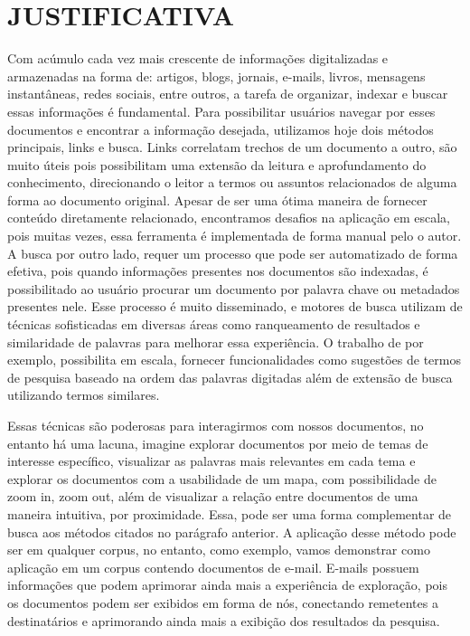 \documentclass[12pt,a4paper]{article}
\begin{document}
\section{JUSTIFICATIVA}
Com acúmulo cada vez mais crescente de informações digitalizadas e armazenadas na forma de: artigos, blogs, jornais, e-mails, livros, mensagens instantâneas, redes sociais, entre outros, a tarefa de organizar, indexar e buscar essas informações é fundamental. Para possibilitar usuários navegar por esses documentos e encontrar a informação desejada, utilizamos hoje dois métodos principais, links e busca. Links correlatam trechos de um documento a outro, são muito úteis pois possibilitam uma extensão da leitura e aprofundamento do conhecimento, direcionando o leitor a termos ou assuntos relacionados de alguma forma ao documento original. Apesar de ser uma ótima maneira de fornecer conteúdo diretamente relacionado, encontramos desafios na aplicação em escala, pois muitas vezes, essa ferramenta  é implementada de forma manual pelo o autor. A busca por outro lado, requer um processo que pode ser automatizado de forma efetiva, pois quando informações presentes nos documentos são indexadas, é possibilitado ao usuário procurar um documento por palavra chave ou metadados presentes nele. Esse processo é muito disseminado, e motores de busca utilizam de técnicas sofisticadas em diversas áreas como ranqueamento de resultados e similaridade de palavras para melhorar essa experiência. O trabalho de  por exemplo, possibilita em escala, fornecer funcionalidades como sugestões de termos de pesquisa baseado na ordem das palavras digitadas além de extensão de busca utilizando termos similares.

Essas técnicas são poderosas para interagirmos com nossos documentos, no entanto há uma lacuna, imagine explorar documentos por meio de temas de interesse específico, visualizar as palavras mais relevantes em cada tema e explorar os documentos com a usabilidade de um mapa, com possibilidade de zoom in, zoom out, além de visualizar a relação entre documentos de uma maneira intuitiva, por proximidade. Essa, pode ser uma forma complementar de busca aos métodos citados no parágrafo anterior. A aplicação desse método pode ser em qualquer corpus, no entanto, como exemplo, vamos demonstrar como aplicação em um corpus contendo documentos de e-mail.
E-mails possuem informações que podem aprimorar ainda mais a experiência de exploração, pois os documentos podem ser exibidos em forma de nós, conectando remetentes a destinatários e aprimorando ainda mais a exibição dos resultados da pesquisa.
\end{document}
